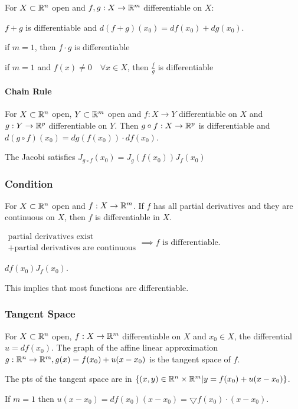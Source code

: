 For $X \subset \mathbb{R}^n$ open and $f, g: X \to \mathbb{R}^m$ differentiable on $X$:
\begin{compactitem}
    \item $f + g$ is differentiable and $d(f + g)(x_0) = df(x_0) + dg(x_0)$.
    \item if $m = 1$, then $f \cdot g$ is differentiable
    \item if $m = 1$ and $f(x) \neq 0 \quad \forall x \in X$, then $\frac{f}{g}$ is differentiable
\end{compactitem}

\paragraph{Chain Rule}
For $X \subset \mathbb{R}^n$ open, $Y \subset \mathbb{R}^m$ open and $f: X \to Y$ differentiable on $X$ and $g: Y \to \mathbb{R}^p$ differentiable on $Y$. Then $g \circ f: X \to \mathbb{R}^p$ is differentiable and $d(g \circ f)(x_0) = dg(f(x_0)) \cdot df(x_0)$.

\begin{compactitem}
    \item The Jacobi satisfies $J_{g \circ f}(x_0) = J_g(f(x_0))J_f(x_0)$
\end{compactitem}

\subsubsection{Condition}
For $X \subset \mathbb{R}^n$ open and $f: X \to \mathbb{R}^m$. If $f$ has all partial derivatives and they are continuous on $X$, then $f$ is differentiable in $X$.

\begin{compactitem}
    \item $\substack{\text{partial derivatives exist}\\ + \text{partial derivatives are continuous}} \implies f \text{ is differentiable}$.
    \item $df(x_0) J_f(x_0)$.
    \item This implies that most functions are differentiable.
\end{compactitem}

\subsubsection{Tangent Space}
For $X \subset \mathbb{R}^n$ open, $f: X \to \mathbb{R}^m$ differentiable on $X$ and $x_0 \in X$, the differential $u = df(x_0)$. The graph of the affine linear approximation $g: \mathbb{R}^n \to \mathbb{R}^m, g(x) = f(x_0) + u(x - x_0)$ is the tangent space of $f$.
\begin{compactitem}
    \item The pts of the tangent space are in $\{(x, y) \in \mathbb{R}^n \times \mathbb{R}^m | y = f(x_0) + u(x - x_0) \}$.
    \item If $m = 1$ then $u(x - x_0) = df(x_0)(x - x_0) = \bigtriangledown f(x_0) \cdot (x - x_0)$.
\end{compactitem}


